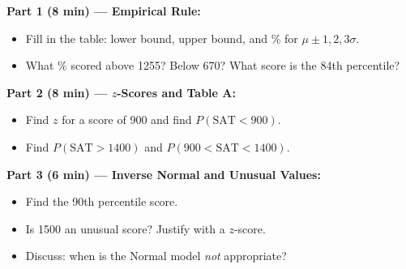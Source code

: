 \documentclass[aspectratio=169, 11pt]{beamer}
\begin{document}
{
\begin{frame}[t, plain]
  \vspace{0.8em}%
  \hspace{0.55cm}%
  \begin{minipage}{0.9\textwidth}
    \small

    \textbf{Part 1 (8 min) --- Empirical Rule:}
    \begin{itemize}
      \setlength{\itemsep}{0.4em}
      \item Fill in the table: lower bound, upper bound, and \% for $\mu \pm 1,2,3\sigma$.
      \item What \% scored above 1255? Below 670? What score is the 84th percentile?
    \end{itemize}

    \vspace{0.5em}
    \textbf{Part 2 (8 min) --- $z$-Scores and Table A:}
    \begin{itemize}
      \setlength{\itemsep}{0.4em}
      \item Find $z$ for a score of 900 and find $P(\text{SAT} < 900)$.
      \item Find $P(\text{SAT} > 1400)$ and $P(900 < \text{SAT} < 1400)$.
    \end{itemize}

    \vspace{0.5em}
    \textbf{Part 3 (6 min) --- Inverse Normal and Unusual Values:}
    \begin{itemize}
      \setlength{\itemsep}{0.4em}
      \item Find the 90th percentile score.
      \item Is 1500 an unusual score? Justify with a $z$-score.
      \item Discuss: when is the Normal model \textit{not} appropriate?
    \end{itemize}
  \end{minipage}
\end{frame}
}
\end{document}
